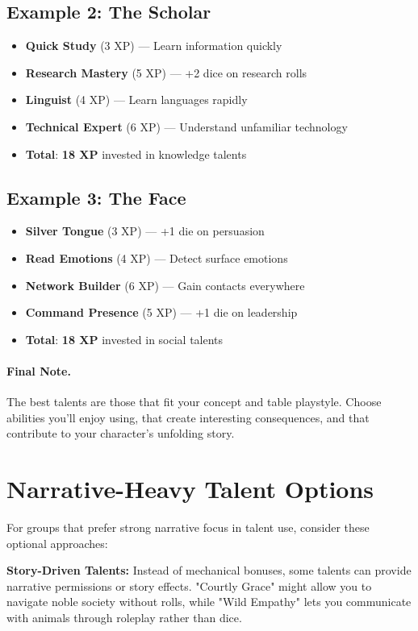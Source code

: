\subsection*{Example 2: The Scholar}
\begin{itemize}
\item \textbf{Quick Study} (3 XP) --- Learn information quickly
\item \textbf{Research Mastery} (5 XP) --- +2 dice on research rolls
\item \textbf{Linguist} (4 XP) --- Learn languages rapidly
\item \textbf{Technical Expert} (6 XP) --- Understand unfamiliar technology
\item \textbf{Total}: \textbf{18 XP} invested in knowledge talents
\end{itemize}

\subsection*{Example 3: The Face}
\begin{itemize}
\item \textbf{Silver Tongue} (3 XP) --- +1 die on persuasion
\item \textbf{Read Emotions} (4 XP) --- Detect surface emotions
\item \textbf{Network Builder} (6 XP) --- Gain contacts everywhere
\item \textbf{Command Presence} (5 XP) --- +1 die on leadership
\item \textbf{Total}: \textbf{18 XP} invested in social talents
\end{itemize}

\paragraph{Final Note.}
The best talents are those that fit your concept and table playstyle. Choose abilities you'll enjoy using, that create interesting consequences, and that contribute to your character's unfolding story.

\section{Narrative-Heavy Talent Options}

For groups that prefer strong narrative focus in talent use, consider these optional approaches:

\textbf{Story-Driven Talents:} Instead of mechanical bonuses, some talents can provide narrative permissions or story effects. "Courtly Grace" might allow you to navigate noble society without rolls, while "Wild Empathy" lets you communicate with animals through roleplay rather than dice.

